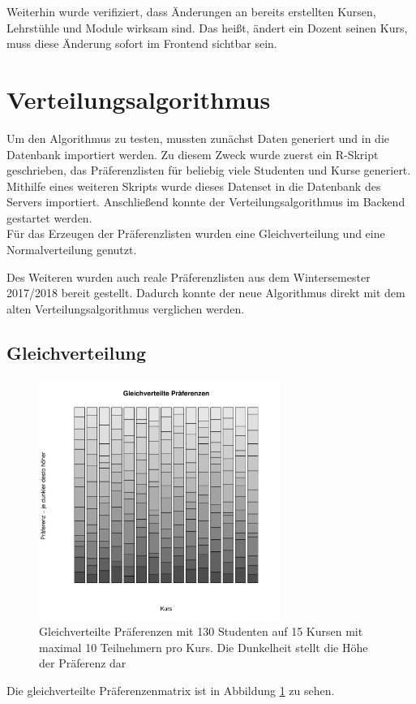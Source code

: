 			Weiterhin wurde verifiziert, dass Änderungen an bereits erstellten Kursen, Lehrstühle und Module wirksam sind.
			Das heißt, ändert ein Dozent seinen Kurs, muss diese Änderung sofort im Frontend sichtbar sein.
	
	\section{Verteilungsalgorithmus}
		Um den Algorithmus zu testen, mussten zunächst Daten generiert und in die Datenbank importiert werden.
		Zu diesem Zweck wurde zuerst ein R-Skript geschrieben, das Präferenzlisten für beliebig viele Studenten und Kurse generiert.
		Mithilfe eines weiteren Skripts wurde dieses Datenset in die Datenbank des Servers importiert.
		Anschließend konnte der Verteilungsalgorithmus im Backend gestartet werden.\\
		
		Für das Erzeugen der Präferenzlisten wurden eine Gleichverteilung und eine Normalverteilung genutzt.
    	
        Des Weiteren wurden auch reale Präferenzlisten aus dem Wintersemester 2017/2018 bereit gestellt.
		Dadurch konnte der neue Algorithmus direkt mit dem alten Verteilungsalgorithmus verglichen werden.
		
		\subsection{Gleichverteilung}
	
			\begin{figure}
				\centering
				\includegraphics[width=0.7\textwidth]{./testing/images/EqualDistPreferencesDist.jpg}
				\caption{Gleichverteilte Präferenzen mit 130 Studenten auf 15 Kursen mit maximal 10 Teilnehmern pro Kurs. Die Dunkelheit stellt die Höhe der Präferenz dar}
				\label{fig:test_equal_distribution}
			\end{figure}
			Die gleichverteilte Präferenzenmatrix ist in Abbildung \ref{fig:test_equal_distribution} zu sehen.
			
